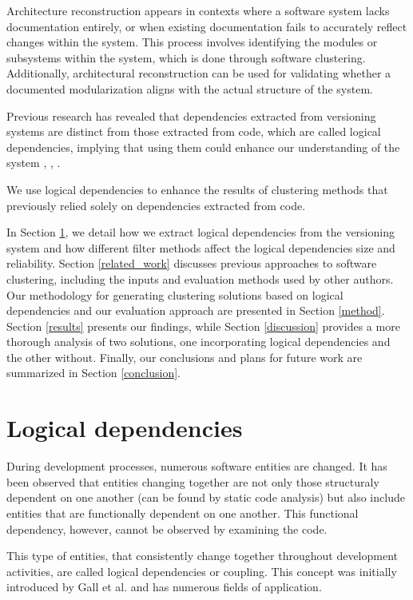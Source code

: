 \documentclass[conference]{IEEEtran}
\begin{document}
Architecture reconstruction appears in contexts where a software system lacks documentation entirely, or when existing documentation fails to accurately reflect changes within the system. This process involves identifying the modules or subsystems within the system, which is done through software clustering. Additionally, architectural reconstruction can be used for validating whether a documented modularization aligns with the actual structure of the system.

Previous research has revealed that dependencies extracted from versioning systems are distinct from those extracted from code, which are called logical dependencies, implying that using them could enhance our understanding of the system \cite{DBLP:conf/issre/OlivaG15}, \cite{DBLP:journals/jss/AjienkaC17}, \cite{Oliva:2011:ISL:2067853.2068086}.

We use logical dependencies to enhance the results of clustering methods that previously relied solely on dependencies extracted from code. 

In Section \ref{ld_def}, we detail how we extract logical dependencies from the versioning system and how different filter methods affect the logical dependencies size and reliability. Section \ref{related_work} discusses previous approaches to software clustering, including the inputs and evaluation methods used by other authors. Our methodology for generating clustering solutions based on logical dependencies and our evaluation approach are presented in Section \ref{method}. Section \ref{results} presents our findings, while Section \ref{discussion} provides a more thorough analysis of two solutions, one incorporating logical dependencies and the other without. Finally, our conclusions and plans for future work are summarized in Section \ref{conclusion}.


\section{Logical dependencies}
\label{ld_def}

During development processes, numerous software entities are changed. It has been observed that entities changing together are not only those structuraly dependent on one another (can be found by static code analysis) but also include entities that are functionally dependent on one another. This functional dependency, however, cannot be observed by examining the code.

This type of entities, that consistently change together throughout development activities, are called logical dependencies or coupling. This concept was initially introduced by Gall et al. \cite{Gall:1998:DLC:850947.853338} and has numerous fields of application.
\end{document}
